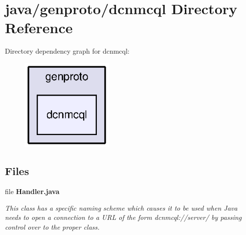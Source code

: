 \section{java/genproto/dcnmcql Directory Reference}
\label{dir_071e5978995a6bdbb4f4891334cbfb92}
Directory dependency graph for dcnmcql\+:\nopagebreak
\begin{figure}[H]
\begin{center}
\leavevmode
\includegraphics[width=130pt]{dir_071e5978995a6bdbb4f4891334cbfb92_dep}
\end{center}
\end{figure}
\subsection*{Files}
\begin{DoxyCompactItemize}
\item 
file {\bf Handler.\+java}
\begin{DoxyCompactList}\small\item\em This class has a specific naming scheme which causes it to be used when Java needs to open a connection to a U\+R\+L of the form dcnmcql\+://server/ by passing control over to the proper class. \end{DoxyCompactList}\end{DoxyCompactItemize}
